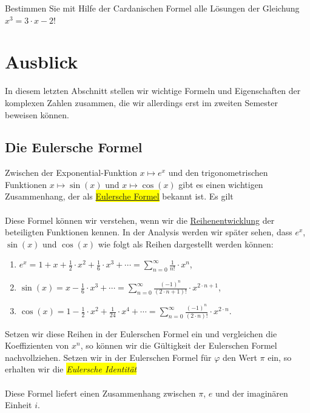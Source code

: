 \exercise
Bestimmen Sie mit Hilfe der Cardanischen Formel alle L\"{o}sungen der Gleichung 
\\[0.2cm]
\hspace*{1.3cm}
$x^3 = 3 \cdot x - 2$!
\exend


\section{Ausblick}
In diesem letzten Abschnitt stellen wir wichtige Formeln und Eigenschaften der komplexen Zahlen
zusammen, die wir allerdings erst im zweiten Semester beweisen k\"{o}nnen.

\subsection{Die Eulersche Formel}
Zwischen der Exponential-Funktion $x \mapsto e^x$ und den trigonometrischen Funktionen 
$x \mapsto \sin(x)$ und $x \mapsto \cos(x)$ gibt es einen wichtigen Zusammenhang, der als
\colorbox{yellow}{\href{https://de.wikipedia.org/wiki/Eulersche_Formel}{Eulersche Formel}} bekannt ist.  Es gilt
\\[0.2cm]
\hspace*{1.3cm}
\colorbox{red}{}
\\[0.2cm]
Diese Formel k\"{o}nnen wir verstehen, wenn wir die
\href{https://de.wikipedia.org/wiki/Taylorreihe}{Reihenentwicklung} der beteiligten Funktionen
kennen.  In der Analysis werden wir sp\"{a}ter sehen, dass $e^x$, $\sin(x)$ und $\cos(x)$ wie folgt als Reihen
dargestellt werden k\"{o}nnen:
\begin{enumerate}
\item $\displaystyle e^x = 1 + x + \frac{1}{2} \cdot x^2 + \frac{1}{6} \cdot x^3 + \cdots = \sum\limits_{n=0}^\infty \frac{1}{n!} \cdot x^n$,
\item $\displaystyle \sin(x) = x - \frac{1}{6} \cdot x^3 + \cdots = \sum\limits_{n=0}^\infty \frac{(-1)^{n}}{(2 \cdot n + 1)!} \cdot x^{2 \cdot n + 1}$,
\item $\displaystyle \cos(x) = 1 -  \frac{1}{2} \cdot x^2 +  \frac{1}{24} \cdot x^4 + \cdots = \sum\limits_{n=0}^\infty  \frac{(-1)^{n}}{(2 \cdot n)!} \cdot x^{2 \cdot n}$.
\end{enumerate}
Setzen wir diese Reihen in der Eulerschen Formel ein und vergleichen die Koeffizienten von $x^n$, so
k\"{o}nnen wir die G\"{u}ltigkeit der Eulerschen Formel nachvollziehen.  Setzen wir in der Eulerschen Formel
f\"{u}r $\varphi$ den Wert $\pi$ ein, so erhalten wir die \colorbox{yellow}{\emph{Eulersche Identit\"{a}t}}
\\[0.2cm]
\hspace*{1.3cm}
\colorbox{red}{}
\\[0.2cm]
Diese Formel liefert einen Zusammenhang zwischen $\pi$, $e$ und der imagin\"{a}ren Einheit $i$.


